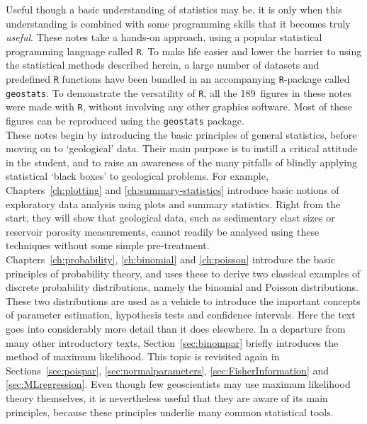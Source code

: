 Useful though a basic understanding of statistics may be, it is only
when this understanding is combined with some programming skills that
it becomes truly \emph{useful}. These notes take a hands-on approach,
using a popular statistical programming language called \texttt{R}.
To make life easier and lower the barrier to using the statistical
methods described herein, a large number of datasets and predefined
\texttt{R} functions have been bundled in an accompanying
\texttt{R}-package called \texttt{geostats}.  To demonstrate the
versatility of \texttt{R}, all the 189~figures in these notes were
made with \texttt{R}, without involving any other graphics
software. Most of these figures can be reproduced using the
\texttt{geostats} package.\\

These notes begin by introducing the basic principles of general
statistics, before moving on to `geological' data. Their main purpose
is to instill a critical attitude in the student, and to raise an
awareness of the many pitfalls of blindly applying statistical `black
boxes' to geological problems. For example, Chapters~\ref{ch:plotting}
and \ref{ch:summary-statistics} introduce basic notions of exploratory
data analysis using plots and summary statistics. Right from the
start, they will show that geological data, such as sedimentary clast
sizes or reservoir porosity measurements, cannot readily be analysed
using these techniques without some simple pre-treatment.\\

Chapters~\ref{ch:probability}, \ref{ch:binomial} and \ref{ch:poisson}
introduce the basic principles of probability theory, and uses these
to derive two classical examples of discrete probability
distributions, namely the binomial and Poisson distributions. These
two distributions are used as a vehicle to introduce the important
concepts of parameter estimation, hypothesis tests and confidence
intervals. Here the text goes into considerably more detail than it
does elsewhere. In a departure from many other introductory texts,
Section~\ref{sec:binompar} briefly introduces the method of maximum
likelihood. This topic is revisited again in
Sections~\ref{sec:poispar}, \ref{sec:normalparameters},
\ref{sec:FisherInformation} and \ref{sec:MLregression}. Even though
few geoscientists may use maximum likelihood theory themselves, it is
nevertheless useful that they are aware of its main principles,
because these principles underlie many common statistical tools.\\

